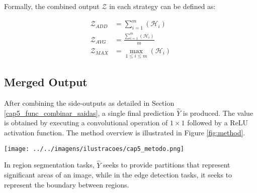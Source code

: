 Formally, the combined output $\mathcal{Z}$ in each strategy can be defined as:

\begin{align}
  \mathcal{Z}_{ADD} &= \sum_{i=1}^{m}(\mathcal{H}_i)\\
  \mathcal{Z}_{AVG} &= \frac{\sum_{i=1}^{m}(\mathcal{H}_i)}{m}\\
  \mathcal{Z}_{MAX} &= \max_{1 \leq i \leq m} (\mathcal{H}_i)
\end{align} 

\subsection{Merged Output}
\label{cap5_saida_final_rede}

After combining the side-outputs as detailed in Section \ref{cap5_func_combinar_saidas}, a single final prediction $\hat{Y}$ is produced.
The value is obtained by executing a convolutional operation of $1 \times 1$ followed by a ReLU activation function.
The method overview is illustrated in Figure \ref{fig:method}.

\begin{figure*}
  \centering
  \caption{Overview of our method.}
  \texttt{[image: ../../imagens/ilustracoes/cap5\_metodo.png]}
  \sourceOwn
  \label{fig:method}
\end{figure*}


In region segmentation tasks, $\hat{Y}$ seeks to provide partitions that represent significant areas of an image, while in the edge detection tasks, it seeks to represent the boundary between regions.

\begin{comment}
Na tarefa de segmentação multirregiões, a proposição $\hat{Y}$ pode ser reduzida a um problema binário.
Nele, objetivo seria distinguir cada pixel da imagem como pertencente a uma região de interesse ou ao fundo.
Se confrontado com múltiplas regiões de interesse, este mínimo de formulação pode ser executado individualmente e, os resultados, em seguida, unidos.
\end{comment}

